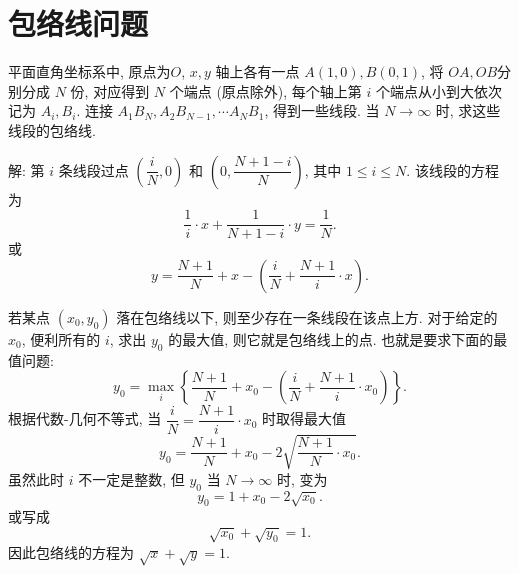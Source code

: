 \section{包络线问题}
平面直角坐标系中, 原点为$O$, $x,y$ 轴上各有一点 $A(1,0), B(0,1)$, 将 $OA,OB$分别分成 $N$ 份, 对应得到 $N$ 个端点 (原点除外), 每个轴上第 $i$ 个端点从小到大依次记为 $A_i, B_i$. 连接 $A_1B_N, A_2B_{N-1}, \cdots A_NB_1$, 得到一些线段. 当 $N\to\infty$ 时, 求这些线段的包络线.
\begin{figure*}[htbp]
\centering
{}
\end{figure*}

解: 第 $i$ 条线段过点 $(\dfrac{i}{N}, 0)$ 和 $(0, \dfrac{N+1-i}{N})$, 其中 $1\le i\le N$. 该线段的方程为
\[\frac{1}{i}\cdot x + \frac{1}{N+1-i}\cdot y=\frac{1}{N}.\]
或
\[y=\frac{N+1}{N} + x - \left(\frac{i}{N} + \frac{N+1}{i}\cdot x\right).\]

若某点 $(x_0,y_0)$ 落在包络线以下, 则至少存在一条线段在该点上方. 对于给定的 $x_0$, 便利所有的 $i$, 求出 $y_0$ 的最大值, 则它就是包络线上的点. 也就是要求下面的最值问题:
\[y_0 = \mathop{\max}_i \left\{ \frac{N+1}{N} + x_0 - \left(\frac{i}{N} + \frac{N+1}{i}\cdot x_0\right) \right\} .\]
根据代数-几何不等式, 当 $\dfrac{i}{N} = \dfrac{N+1}{i}\cdot x_0$ 时取得最大值
\[ y_0 = \frac{N+1}{N} + x_0 - 2\sqrt{\frac{N+1}{N}\cdot x_0} .\]
虽然此时 $i$ 不一定是整数, 但 $y_0$ 
当 $N\to\infty$ 时, 变为
\[y_0 = 1 + x_0 - 2\sqrt{x_0} .\]
或写成
\[\sqrt{x_0}+\sqrt{y_0} = 1.\]
因此包络线的方程为 $\sqrt{x}+\sqrt{y}=1$.









